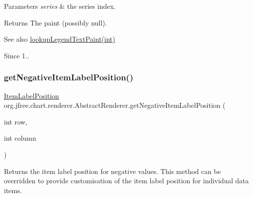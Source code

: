 \begin{DoxyParams}{Parameters}
{\em series} & the series index.\\
\hline
\end{DoxyParams}
\begin{DoxyReturn}{Returns}
The paint (possibly {\ttfamily null}).
\end{DoxyReturn}
\begin{DoxySeeAlso}{See also}
\mbox{\hyperlink{classorg_1_1jfree_1_1chart_1_1renderer_1_1_abstract_renderer_a53b35f826cab840cdbaee9169388f305}{lookup\+Legend\+Text\+Paint(int)}}
\end{DoxySeeAlso}
\begin{DoxySince}{Since}
1.. 
\end{DoxySince}
\mbox{\label{classorg_1_1jfree_1_1chart_1_1renderer_1_1_abstract_renderer_ade5ebf7f08f0b93908ac4b1eb0099902}} 
\subsubsection{\texorpdfstring{get\+Negative\+Item\+Label\+Position()}{getNegativeItemLabelPosition()}\hspace{0.1cm}{\footnotesize\ttfamily [1/2]}}
{\footnotesize\ttfamily \mbox{\hyperlink{classorg_1_1jfree_1_1chart_1_1labels_1_1_item_label_position}{Item\+Label\+Position}} org.\+jfree.\+chart.\+renderer.\+Abstract\+Renderer.\+get\+Negative\+Item\+Label\+Position (\begin{DoxyParamCaption}\item[{int}]{row,  }\item[{int}]{column }\end{DoxyParamCaption})}

Returns the item label position for negative values. This method can be overridden to provide customisation of the item label position for individual data items.


